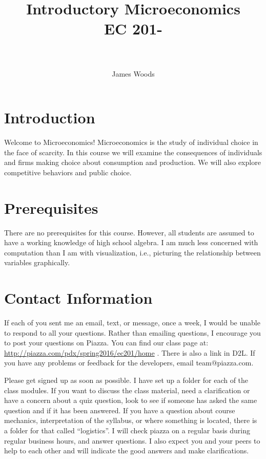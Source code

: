 \documentclass[letterpaper,10pt]{article}
\title{
Introductory Microeconomics\\
EC 201-\Section \\
\Term\\
}
\author{James Woods}
\date{}
\begin{document}
\maketitle

\section{Introduction}

Welcome to Microeconomics! Microeconomics is the study of individual
choice in the face of scarcity. In this course we will examine the
consequences of individuals and firms making choice about consumption
and production. We will also explore competitive behaviors and public
choice.

\section{Prerequisites}

There are no prerequisites for this course. However, all students are
assumed to have a working knowledge of high school algebra. I am much
less concerned with computation than I am with visualization, i.e.,
picturing the relationship between variables graphically.


\section{Contact Information}
If each of you sent me an email, text, or message, once a week, I would be unable to respond to all your questions.  Rather than emailing questions, I encourage you to post your questions on Piazza. You can find our class page at: \url{http://piazza.com/pdx/spring2016/ec201/home} .  There is also a link in D2L. If you have any problems or feedback for the developers, email team@piazza.com.

Please get signed up as soon as possible. I have set up a
folder for each of the class modules. If you want to discuss the class material, need a clarification or have a concern about a quiz question, look to see if someone has asked the same question and if it has been answered. 
If you have a question about course mechanics, interpretation of the
syllabus, or where something is located, there is a folder for
that called ``logistics''. I will check piazza on a regular basis during regular business hours, and answer questions. I also expect you and your peers to help to each other and will indicate the good answers and make clarifications.  
\end{document}
